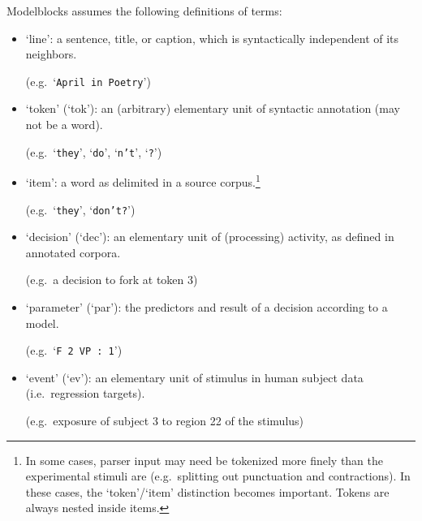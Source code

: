 \documentclass[12pt]{report}
\def\blue{\color{blue}}
\def\magenta{\color{magenta}}
\begin{document}
Modelblocks assumes the following definitions of terms:
%
\begin{itemize}

\item `{\blue line}': a sentence, title, or caption, which is syntactically independent of its neighbors.

      (e.g.\ `{\magenta\tt April in Poetry}')

\item `{\blue token}' (`{\blue tok}'): an (arbitrary) elementary unit of syntactic annotation (may not be a word).

      (e.g.\ `{\magenta\tt they}', `{\magenta\tt do}', `{\magenta\tt n't}', `{\magenta\tt ?}')

\item `{\blue item}': a word as delimited in a source corpus.\footnote{In some cases, parser input may need be tokenized more finely than the experimental stimuli are (e.g.\ splitting out punctuation and contractions). In these cases, the `token'/`item' distinction becomes important. Tokens are always nested inside items.}

      (e.g.\ `{\magenta\tt they}', `{\magenta\tt don't?}')




\item %
      `{\blue decision}' (`{\blue dec}'): an elementary unit of (processing) activity, as defined in annotated corpora.\!\!

      (e.g.\ {\magenta a decision to fork at token 3})

\item `{\blue parameter}' (`{\blue par}'): the predictors and result of a decision according to a model.

      (e.g.\ `{\magenta\tt F 2 VP : 1}')

%

\item `{\blue event}' (`{\blue ev}'): an elementary unit of stimulus in human subject data (i.e.\ regression targets).

      (e.g.\ {\magenta exposure of subject 3 to region 22 of the stimulus})

\end{itemize}
\end{document}
